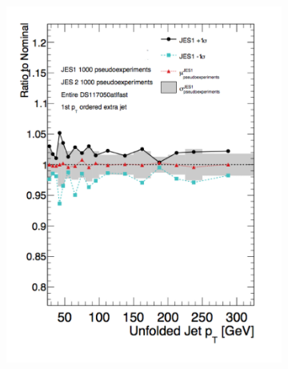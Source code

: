 \begin{figure}
\begin{subfigure}[]{0.45\textwidth}
\includegraphics[width=\textwidth]{fig/UnfoldSys/JESJet0.pdf}
\end{subfigure}
\begin{subfigure}[]{0.45\textwidth}

\end{subfigure}
\end{figure}
